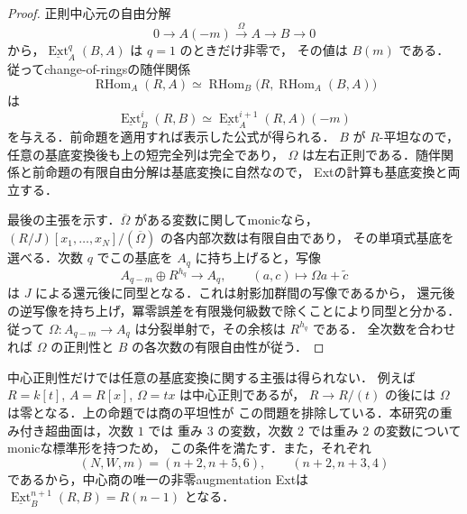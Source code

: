 \begin{proof}
正則中心元の自由分解
\[
 0\longrightarrow A(-m)\xrightarrow{\,\Omega\,}A
 \longrightarrow B\longrightarrow0
\]
から，$\underline{\operatorname{Ext}}_A^q(B,A)$ は $q=1$ のときだけ非零で，
その値は $B(m)$ である．従ってchange-of-ringsの随伴関係
\[
 \operatorname{RHom}_A(R,A)
 \simeq\operatorname{RHom}_B
 \bigl(R,\operatorname{RHom}_A(B,A)\bigr)
\]
は
\[
 \underline{\operatorname{Ext}}_B^i(R,B)
 \simeq\underline{\operatorname{Ext}}_A^{i+1}(R,A)(-m)
\]
を与える．前命題を適用すれば表示した公式が得られる．
$B$ が $R$-平坦なので，任意の基底変換後も上の短完全列は完全であり，
$\Omega$ は左右正則である．随伴関係と前命題の有限自由分解は基底変換に自然なので，
Extの計算も基底変換と両立する．

最後の主張を示す．$\overline\Omega$ がある変数に関してmonicなら，
$(R/J)[x_1,\ldots,x_N]/(\overline\Omega)$ の各内部次数は有限自由であり，
その単項式基底を選べる．次数 $q$ でこの基底を $A_q$ に持ち上げると，写像
\[
 A_{q-m}\oplus R^{h_q}\longrightarrow A_q,
 \qquad(a,c)\longmapsto\Omega a+\widetilde c
\]
は $J$ による還元後に同型となる．これは射影加群間の写像であるから，
還元後の逆写像を持ち上げ，冪零誤差を有限幾何級数で除くことにより同型と分かる．
従って $\Omega:A_{q-m}\to A_q$ は分裂単射で，その余核は $R^{h_q}$ である．
全次数を合わせれば $\Omega$ の正則性と $B$ の各次数の有限自由性が従う．
\end{proof}

\begin{remark}[中心正則性と普遍的正則性の区別]
中心正則性だけでは任意の基底変換に関する主張は得られない．
例えば $R=k[t]$, $A=R[x]$, $\Omega=tx$ は中心正則であるが，
$R\to R/(t)$ の後には $\Omega$ は零となる．上の命題では商の平坦性が
この問題を排除している．本研究の重み付き超曲面は，次数 $1$ では
重み $3$ の変数，次数 $2$ では重み $2$ の変数についてmonicな標準形を持つため，
この条件を満たす．また，それぞれ
\[
 (N,W,m)=(n+2,n+5,6),\qquad(n+2,n+3,4)
\]
であるから，中心商の唯一の非零augmentation Extは
$\underline{\operatorname{Ext}}_B^{n+1}(R,B)=R(n-1)$ となる．
\end{remark}
